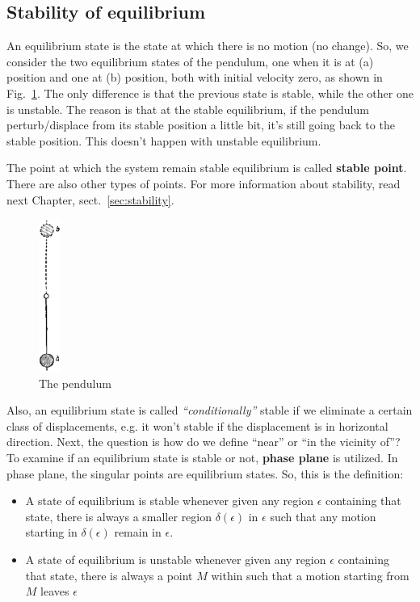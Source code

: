 \subsection{Stability of equilibrium}
\label{sec:stab-equil}

An equilibrium state is the state at which there is no motion (no
change). So, we consider the two equilibrium states of the pendulum,
one when it is at (a) position and one at (b) position, both with
initial velocity zero, as shown in Fig.~\ref{fig:pendulum}.  The only
difference is that the previous state is stable, while the other one
is unstable. The reason is that at the stable equilibrium, if the
pendulum perturb/displace from its stable position a little bit, it's
still going back to the stable position. This doesn't happen with
unstable equilibrium.

The point at which the system remain stable equilibrium is called
{\bf stable point}. There are also other types of points.  For more
information about stability, read next Chapter,
sect.~\ref{sec:stability}.

\begin{figure}[hbt]
  \centerline{\includegraphics[height=5cm]{./images/pendulum.eps}}
  \caption{The pendulum}
  \label{fig:pendulum}
\end{figure}

Also, an equilibrium state is called {\it ``conditionally''} stable if
we eliminate a certain class of displacements, e.g. it won't stable if
the displacement is in horizontal direction. Next, the question is how
do we define ``near'' or ``in the vicinity of''?  To examine if an
equilibrium state is stable or not, {\bf phase plane} is utilized. In
phase plane, the singular points are equilibrium states.  So, this is
the definition:

\begin{itemize}
\item A state of equilibrium is stable whenever given any region
  $\epsilon$ containing that state, there is always a smaller region
  $\delta(\epsilon)$ in $\epsilon$ such that any motion starting in
  $\delta(\epsilon)$ remain in $\epsilon$. 

\item A state of equilibrium is unstable whenever given any region
  $\epsilon$ containing that state, there is always a point $M$ within
  such that a motion starting from $M$ leaves $\epsilon$
\end{itemize}

